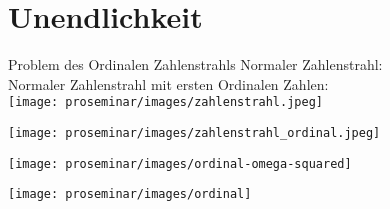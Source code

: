
\section{Unendlichkeit}


% 





\begin{frame}[c]{Problem des Ordinalen Zahlenstrahls}
    \large
     {Normaler Zahlenstrahl: \\}
     {Normaler Zahlenstrahl mit ersten Ordinalen Zahlen:\\}
    \Huge
     {
        \texttt{[image: proseminar/images/zahlenstrahl.jpeg]}
    }

     {
        \texttt{[image: proseminar/images/zahlenstrahl\_ordinal.jpeg]}
    }

     {
        \texttt{[image: proseminar/images/ordinal-omega-squared]}
    }

     {
        \hspace{2cm}
        \texttt{[image: proseminar/images/ordinal]}
    }

\end{frame}



